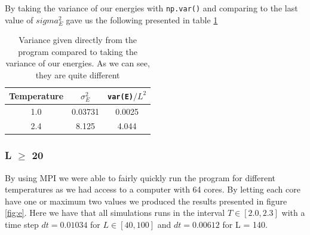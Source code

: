 \documentclass{article}
\begin{document}
By taking the variance of our energies with \texttt{np.var()} and comparing to the last value of $sigma_E^2$ gave us the following presented in table \ref{tab:var}
\begin{table}[H]
\centering
\caption{Variance given directly from the program compared to taking the variance of our energies. As we can see, they are quite different}
\begin{tabular}{c|c|c}
Temperature & $\sigma_E^2$ & \texttt{var(E)}$/L^2$ \\ \hline
1.0 & 0.03731 & 0.0025 \\
2.4 & 8.125 & 4.044
\end{tabular}
\label{tab:var}
\end{table}
\subsubsection*{L $\geq$ 20}
By using MPI we were able to fairly quickly run the program for different temperatures as we had access to a computer with 64 cores. By letting each core have one or maximum two values we produced the results presented in figure \ref{fig:e}. Here we have that all simulations runs in the interval $T \in [2.0, 2.3]$ with a time step $dt = 0.01034$ for $L \in [40, 100]$ and $dt = 0.00612$ for L = 140.
\end{document}

